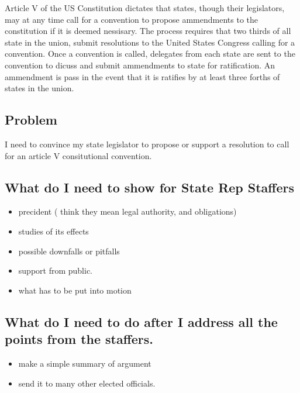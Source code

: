 \documentclass[11pt]{article} %
\begin{document}
Article V of the US Constitution dictates that states, though their legislators, may at any time call for a convention to propose ammendments to the constitution if it is deemed nessisary.  The process requires that two thirds of all state in the union, submit resolutions to the United States Congress calling for a convention.  Once a convention is called, delegates from each state are sent to the convention to dicuss and submit ammendments to state for ratification.    An ammendment is pass in the event that it is ratifies by at least three forths of states in the union. 


\subsection{Problem}
I need to convince my state legislator to propose or support a resolution to call for an article V consitutional convention.

\subsection{What do I need to show for State Rep Staffers}

\begin{itemize}

 \item precident ( think they mean legal authority, and obligations)

\item studies of its effects

\item possible downfalls or pitfalls

\item support from public.

\item what has to be put into motion 

\end{itemize}

\subsection{What do I need to do after I address all the points from the staffers.}

\begin{itemize}

\item make a simple summary of argument

 \item send it to many other elected officials.

\end{itemize}
\end{document}
